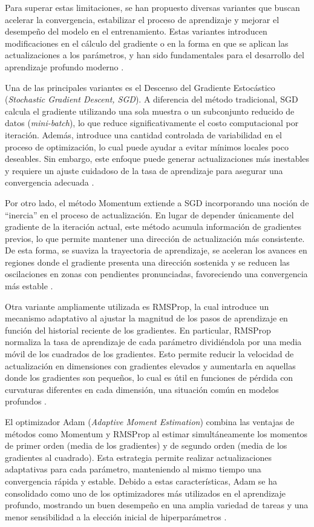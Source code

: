 	Para superar estas limitaciones, se han propuesto diversas variantes que buscan acelerar la convergencia, estabilizar el proceso de aprendizaje y mejorar el desempeño del modelo en el entrenamiento. Estas variantes introducen modificaciones en el cálculo del gradiente o en la forma en que se aplican las actualizaciones a los parámetros, y han sido fundamentales para el desarrollo del aprendizaje profundo moderno \cite{bottou2012sgd, tieleman2012rmsprop}.
	
	Una de las principales variantes es el Descenso del Gradiente Estocástico (\textit{Stochastic Gradient Descent, SGD}). A diferencia del método tradicional, SGD calcula el gradiente utilizando una sola muestra o un subconjunto reducido de datos (\textit{mini-batch}), lo que reduce significativamente el costo computacional por iteración. Además, introduce una cantidad controlada de variabilidad en el proceso de optimización, lo cual puede ayudar a evitar mínimos locales poco deseables. Sin embargo, este enfoque puede generar actualizaciones más inestables y requiere un ajuste cuidadoso de la tasa de aprendizaje para asegurar una convergencia adecuada \cite{geron2019, bottou2012sgd}.
	
	Por otro lado, el método Momentum extiende a SGD incorporando una noción de ``inercia'' en el proceso de actualización. En lugar de depender únicamente del gradiente de la iteración actual, este método acumula información de gradientes previos, lo que permite mantener una dirección de actualización más consistente. De esta forma, se suaviza la trayectoria de aprendizaje, se aceleran los avances en regiones donde el gradiente presenta una dirección sostenida y se reducen las oscilaciones en zonas con pendientes pronunciadas, favoreciendo una convergencia más estable \cite{geron2019, tieleman2012rmsprop}.
	
	Otra variante ampliamente utilizada es RMSProp, la cual introduce un mecanismo adaptativo al ajustar la magnitud de los pasos de aprendizaje en función del historial reciente de los gradientes. En particular, RMSProp normaliza la tasa de aprendizaje de cada parámetro dividiéndola por una media móvil de los cuadrados de los gradientes. Esto permite reducir la velocidad de actualización en dimensiones con gradientes elevados y aumentarla en aquellas donde los gradientes son pequeños, lo cual es útil en funciones de pérdida con curvaturas diferentes en cada dimensión, una situación común en modelos profundos \cite{bottou2012sgd, tieleman2012rmsprop}.
	
	El optimizador Adam (\textit{Adaptive Moment Estimation}) combina las ventajas de métodos como Momentum y RMSProp al estimar simultáneamente los momentos de primer orden (media de los gradientes) y de segundo orden (media de los gradientes al cuadrado). Esta estrategia permite realizar actualizaciones adaptativas para cada parámetro, manteniendo al mismo tiempo una convergencia rápida y estable. Debido a estas características, Adam se ha consolidado como uno de los optimizadores más utilizados en el aprendizaje profundo, mostrando un buen desempeño en una amplia variedad de tareas y una menor sensibilidad a la elección inicial de hiperparámetros \cite{ruder2016overview, loshchilov2019adamw}.
	
